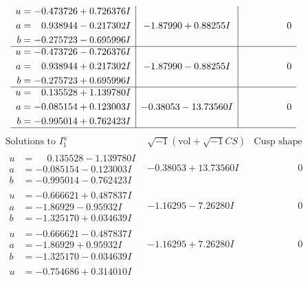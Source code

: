 \documentclass[1p]{elsarticle_modified}
\theoremstyle{definition}
\newcommand{\I}{\sqrt{-1}}
\begin{document}
$$\begin{array}{c|c|c}
\begin{aligned}
u &= -0.473726 + 0.726376 I \\
a &= \phantom{-}0.938944 - 0.217302 I \\
b &= -0.275723 - 0.695996 I\end{aligned}
 & -1.87990 + 0.88255 I & \phantom{-0.000000 } 0 \\ \hline\begin{aligned}
u &= -0.473726 - 0.726376 I \\
a &= \phantom{-}0.938944 + 0.217302 I \\
b &= -0.275723 + 0.695996 I\end{aligned}
 & -1.87990 - 0.88255 I & \phantom{-0.000000 } 0 \\ \hline\begin{aligned}
u &= \phantom{-}0.135528 + 1.139780 I \\
a &= -0.085154 + 0.123003 I \\
b &= -0.995014 + 0.762423 I\end{aligned}
 & -0.38053 - 13.73560 I & \phantom{-0.000000 } 0\\
 \hline 
 \end{array}$$\newpage$$\begin{array}{c|c|c}  
\text{Solutions to }I^u_{1}& \I (\text{vol} + \sqrt{-1}CS) & \text{Cusp shape}\\
 \hline 
\begin{aligned}
u &= \phantom{-}0.135528 - 1.139780 I \\
a &= -0.085154 - 0.123003 I \\
b &= -0.995014 - 0.762423 I\end{aligned}
 & -0.38053 + 13.73560 I & \phantom{-0.000000 } 0 \\ \hline\begin{aligned}
u &= -0.666621 + 0.487837 I \\
a &= -1.86929 - 0.95932 I \\
b &= -1.325170 + 0.034639 I\end{aligned}
 & -1.16295 - 7.26280 I & \phantom{-0.000000 } 0 \\ \hline\begin{aligned}
u &= -0.666621 - 0.487837 I \\
a &= -1.86929 + 0.95932 I \\
b &= -1.325170 - 0.034639 I\end{aligned}
 & -1.16295 + 7.26280 I & \phantom{-0.000000 } 0 \\ \hline\begin{aligned}
u &= -0.754686 + 0.314010 I \\

\end{aligned}
\end{array}$$
\end{document}
